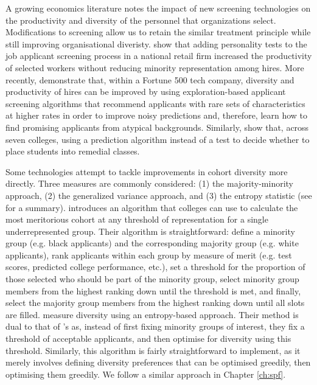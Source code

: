 A growing economics literature notes the impact of new screening technologies on the productivity and diversity of the personnel that organizations select. Modifications to screening allow us to retain the similar treatment principle while still improving organisational diveristy. \textcite{autor2008does} show that adding personality tests to the job applicant screening process in a national retail firm increased the productivity of selected workers without reducing minority representation among hires. More recently, \textcite{li2020hiring} demonstrate that, within a Fortune 500 tech company, diversity and productivity of hires can be improved by using exploration-based applicant screening algorithms that recommend applicants with rare sets of characteristics at higher rates in order to improve noisy predictions and, therefore, learn how to find promising applicants from atypical backgrounds. Similarly, \textcite{bergman2021seven} show that, across seven colleges, using a prediction algorithm instead of a test to decide whether to place students into remedial classes.

Some technologies attempt to tackle improvements in cohort diversity more directly. 
Three measures are commonly considered: (1) the majority-minority approach, (2) the generalized variance approach, and (3) the entropy statistic (see \textcite{budescu2012measure} for a summary). \textcite{kleinberg2018algorithmic} introduces an algorithm that colleges can use to calculate the most meritorious cohort at any threshold of representation for a single underrepresented group. Their algorithm is straightforward: define a minority group (e.g. black applicants) and the corresponding majority group (e.g. white applicants), rank applicants within each group by measure of merit (e.g. test scores, predicted college performance, etc.), set a threshold for the proportion of those selected who should be part of the minority group, select minority group members from the highest ranking down until the threshold is met, and finally, select the majority group members from the highest ranking down until all slots are filled. \textcite{huppenkothen2020entrofy} measure diversity using an entropy-based approach. Their method is dual to that of \textcite{kleinberg2018algorithmic}'s as, instead of first fixing minority groups of interest, they fix a threshold of acceptable applicants, and then optimise for diversity using this threshold. Similarly, this algorithm is fairly straightforward to implement, as it merely involves defining diversity preferences that can be optimised greedily, then optimising them greedily. We follow a similar approach in Chapter \ref{ch:spf}.